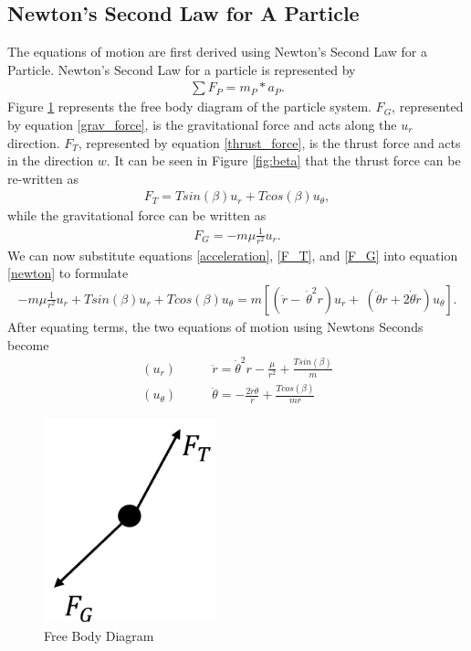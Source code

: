 \documentclass[]{article}
\begin{document}
\subsection{Newton's Second Law for A Particle}
The equations of motion are first derived using Newton's Second Law for a Particle. Newton's Second Law for a particle is represented by
\begin{align}
	\sum{F_{P}} = m_{P} * a_{P}. \label{newton}
\end{align}
\vspace{2mm}\newline
Figure \ref{fig:FBD} represents the free body diagram of the particle system. \(F_{G}\), represented by equation \ref{grav_force}, is the gravitational force and acts along the \(u_{r}\) direction. \(F_{T}\), represented by equation \ref{thrust_force}, is the thrust force and acts in the direction \(w\). It can be seen in Figure \ref{fig:beta} that the thrust force can be re-written as 
\begin{align}
	F_{T} = Tsin(\beta)u_{r} + Tcos(\beta)u_{\theta}, \label{F_T}
\end{align}
while the gravitational force can be written as
\begin{align}
	F_{G} = -m\mu\frac{1}{r^2}u_{r}. \label{F_G}
\end{align}
We can now substitute equations \ref{acceleration},  \ref{F_T}, and \ref{F_G} into equation \ref{newton} to formulate
\begin{align*}
	 -m\mu\frac{1}{r^2}u_{r} + Tsin(\beta)u_{r} + Tcos(\beta)u_{\theta} = m[(\ddot{r} -\ \dot{\theta}^2r)u_{r} +\ (\ddot{\theta}r+2\dot{\theta}\dot{r})u_{\theta}]. 
\end{align*}
After equating terms, the two equations of motion using Newtons Seconds become
\begin{align}
	(u_{r})\qquad      &  \ddot{r}      = \dot{\theta}^2r - \frac{\mu}{r^2} + \frac{Tsin(\beta)}{m} \label{eom1}\\
	(u_{\theta})\qquad &  \ddot{\theta} = -\frac{2\dot{r}\dot{\theta}}{r}   + \frac{Tcos(\beta)}{mr} \label{eom2}
\end{align}
\begin{figure}
    \centering
	\includegraphics[width=50mm,scale=0.5]{FBD.png}
	\caption{Free Body Diagram}
	\label{fig:FBD}
\end{figure}
\end{document}
